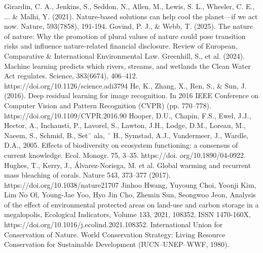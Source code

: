 \documentclass[12pt]{article}
\theoremstyle{break} %
\begin{document}
\newline \newline
Girardin, C. A., Jenkins, S., Seddon, N., Allen, M., Lewis, S. L., Wheeler, C. E., ... \& Malhi, Y. (2021). Nature-based solutions can help cool the planet—if we act now. Nature, 593(7858), 191-194.
\newline \newline
Govind, P. J., \& Webb, T. (2025). The nature of nature: Why the promotion of plural values of nature could pose transition risks and influence nature‐related financial disclosure. Review of European, Comparative \& International Environmental Law.
\newline \newline
Greenhill, S., et al. (2024). Machine learning predicts which rivers, streams, and wetlands the Clean Water Act regulates. Science, 383(6674), 406–412. https://doi.org/10.1126/science.adi3794
\newline \newline
He, K., Zhang, X., Ren, S., \& Sun, J. (2016). Deep residual learning for image recognition. In 2016 IEEE Conference on Computer Vision and Pattern Recognition (CVPR) (pp. 770–778). https://doi.org/10.1109/CVPR.2016.90
\newline \newline
Hooper, D.U., Chapin, F.S., Ewel, J.J., Hector, A., Inchausti, P., Lavorel, S., Lawton, J.H., Lodge, D.M., Loreau, M., Naeem, S., Schmid, B., Set¨ ala, ¨ H., Symstad, A.J., Vandermeer, J., Wardle, D.A., 2005. Effects of biodiversity on ecosystem functioning: a consensus of current knowledge. Ecol. Monogr. 75, 3–35. https://doi. org/10.1890/04-0922.
\newline \newline
Hughes, T., Kerry, J., Álvarez-Noriega, M. et al. Global warming and recurrent mass bleaching of corals. Nature 543, 373–377 (2017). https://doi.org/10.1038/nature21707
\newline \newline
Jinhoo Hwang, Yuyoung Choi, Yoonji Kim, Lim No Ol, Young-Jae Yoo, Hyo Jin Cho, Zhemin Sun, Seongwoo Jeon, Analysis of the effect of environmental protected areas on land-use and carbon storage in a megalopolis, Ecological Indicators, Volume 133, 2021, 108352, ISSN 1470-160X, https://doi.org/10.1016/j.ecolind.2021.108352.
\newline \newline
International Union for Conservation of Nature. World Conservation Strategy: Living Resource Conservation for Sustainable Development (IUCN–UNEP–WWF, 1980). 
\end{document}
